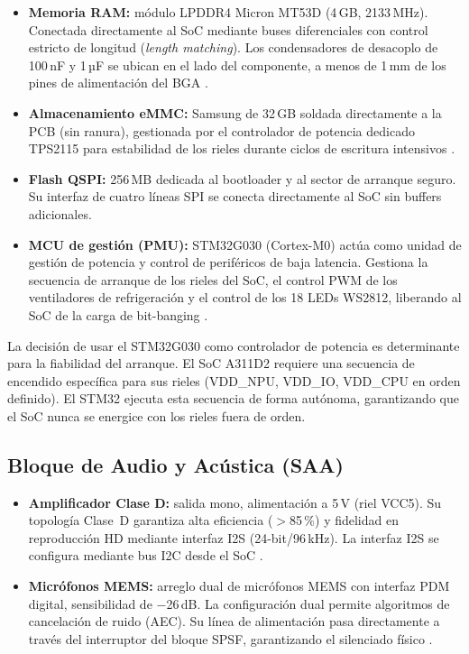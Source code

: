 \begin{itemize}
  \item \textbf{Memoria RAM:} módulo LPDDR4 Micron MT53D (4\,GB, 2133\,MHz). Conectada directamente al SoC mediante buses diferenciales con control estricto de longitud (\textit{length matching}). Los condensadores de desacoplo de 100\,nF y 1\,µF se ubican en el lado del componente, a menos de 1\,mm de los pines de alimentación del BGA .
  \item \textbf{Almacenamiento eMMC:} Samsung de 32\,GB soldada directamente a la PCB (sin ranura), gestionada por el controlador de potencia dedicado TPS2115 para estabilidad de los rieles durante ciclos de escritura intensivos .
  \item \textbf{Flash QSPI:} 256\,MB dedicada al bootloader y al sector de arranque seguro. Su interfaz de cuatro líneas SPI se conecta directamente al SoC sin buffers adicionales.
  \item \textbf{MCU de gestión (PMU):} STM32G030 (Cortex-M0) actúa como unidad de gestión de potencia y control de periféricos de baja latencia. Gestiona la secuencia de arranque de los rieles del SoC, el control PWM de los ventiladores de refrigeración y el control de los 18 LEDs WS2812, liberando al SoC de la carga de bit-banging .
\end{itemize}

\begin{infobox}
  La decisión de usar el STM32G030 como controlador de potencia es determinante para la fiabilidad del arranque. El SoC A311D2 requiere una secuencia de encendido específica para sus rieles (VDD\_NPU, VDD\_IO, VDD\_CPU en orden definido). El STM32 ejecuta esta secuencia de forma autónoma, garantizando que el SoC nunca se energice con los rieles fuera de orden.
\end{infobox}

\subsection{Bloque de Audio y Acústica (SAA)}

\begin{itemize}
  \item \textbf{Amplificador Clase D:} salida mono, alimentación a 5\,V (riel VCC5). Su topología Clase~D garantiza alta eficiencia ($>$85\,\%) y fidelidad en reproducción HD mediante interfaz I2S (24-bit/96\,kHz). La interfaz I2S se configura mediante bus I2C desde el SoC .
  \item \textbf{Micrófonos MEMS:} arreglo dual de micrófonos MEMS con interfaz PDM digital, sensibilidad de $-$26\,dB. La configuración dual permite algoritmos de cancelación de ruido (AEC). Su línea de alimentación pasa directamente a través del interruptor del bloque SPSF, garantizando el silenciado físico .
\end{itemize}


